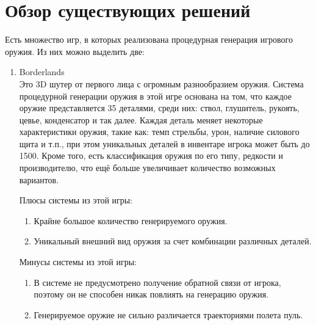﻿%
\section{Обзор существующих решений}\label{sec:existingSolutions}

Есть множество игр, в которых реализована процедурная генерация игрового оружия. Из них можно выделить две:

\begin{enumerate}
    \item Borderlands\cite{s14}\\ Это 3D шутер от первого лица с огромным разнообразием оружия. Система процедурной генерации оружия в этой игре основана на том, что каждое оружие представляется 35 деталями, среди них: ствол, глушитель, рукоять, цевье, конденсатор и так далее. Каждая деталь меняет некоторые характеристики оружия, такие как: темп стрельбы, урон, наличие силового щита и т.п., при этом уникальных деталей в инвентаре игрока может быть до 1500. Кроме того, есть классификация оружия по его типу, редкости и производителю, что ещё больше увеличивает количество возможных вариантов.
    
    Плюсы системы из этой игры:
    \begin{enumerate}[--]
        \item Крайне большое количество генерируемого оружия.
        \item Уникальный внешний вид оружия за счет комбинации различных деталей.
    \end{enumerate}
    
    Минусы системы из этой игры:
    \begin{enumerate}[--]
        \item В системе не предусмотрено получение обратной связи от игрока, поэтому он не способен никак повлиять на генерацию оружия.
        \item Генерируемое оружие не сильно различается траекториями полета пуль.
    \end{enumerate}
\end{enumerate}



